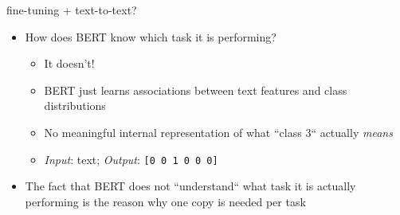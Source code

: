 
\begin{frame}{fine-tuning + text-to-text?}

\vfill

\begin{itemize}
	\item \ques How does BERT know which task it is performing?
			\begin{itemize}
				\item It doesn't!
				\item BERT just learns associations between text features and class distributions
				\item No meaningful internal representation of what ``class 3`` actually \textit{means}
				\item \textit{Input}: text; \textit{Output}: \texttt{[0 0 1 0 0 0]}
			\end{itemize}
	\item The fact that BERT does not ``understand`` what task it is actually performing is the reason why one copy is needed per task
\end{itemize}

\vfill

\end{frame}


